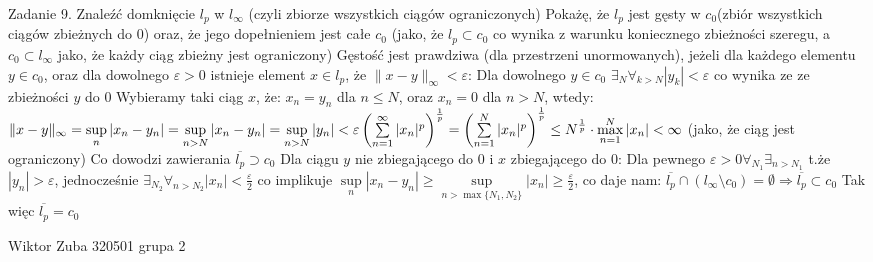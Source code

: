 \documentclass{article}
\begin{document}
Zadanie 9.
\newline
\newline
Znaleźć domknięcie $l_{p}$ w $l_{\infty}$ (czyli zbiorze wszystkich ciągów ograniczonych)\newline
Pokażę, że $l_{p}$ jest gęsty w $c_0$(zbiór wszystkich ciągów zbieżnych do 0) oraz, że jego dopełnieniem jest całe $c_0$
(jako, że $l_{p}\subset c_0$ co wynika z warunku koniecznego zbieżności szeregu,\newline
a $c_0\subset l_{\infty}$ jako, że  każdy ciąg zbieżny jest ograniczony)\newline
Gęstość jest prawdziwa (dla przestrzeni unormowanych), jeżeli dla każdego elementu $y\in c_0$, oraz dla dowolnego $\varepsilon>0$
istnieje element $x\in l_{p}$, że $\lVert x-y\rVert_{\infty}<\varepsilon$:\newline
Dla dowolnego $y\in c_0$ $\exists_{N}\forall_{k>N} |y_k|<\varepsilon$ co wynika ze ze zbieżności $y$ do $0$\newline
Wybieramy taki ciąg $x$, że: $x_n=y_n$ dla $n\le N$, oraz $x_n=0$ dla $n>N$, wtedy:\newline
$
\lVert x-y\rVert_{\infty}=\sup\limits_{n}|x_n-y_n|=\sup\limits_{n>N}|x_n-y_n|=\sup\limits_{n>N}|y_n|<\varepsilon\newline
\left(\sum\limits_{n=1}^{\infty}|x_n|^p\right)^{\frac{1}{p}}=\left(\sum\limits_{n=1}^{N}|x_n|^p\right)^{\frac{1}{p}}\le
N^{\frac{1}{p}}\cdot\max\limits_{n=1}^{N}|x_n|<\infty$ (jako, że ciąg jest ograniczony)\newline
Co dowodzi zawierania $\overline{l_p}\supset c_0$\newline
Dla ciągu $y$ nie zbiegającego do $0$ i $x$ zbiegającego do $0$:
Dla pewnego $\varepsilon>0 \forall_{N_1}\exists_{n>N_1}$ t.że $|y_n|>\varepsilon$,\newline
jednocześnie $\exists_{N_2}\forall_{n>N_2} |x_n|<\frac{\varepsilon}{2}$
co implikuje $\sup\limits_{n}|x_n-y_n|\ge\sup\limits_{n>\max\{N_1,N_2\}}|x_n|\ge\frac{\varepsilon}{2}$, co daje nam:\newline
$\overline{l_p}\cap(l_{\infty}\setminus c_0)=\emptyset\Rightarrow\overline{l_p}\subset c_0$\newline
Tak więc $\overline{l_p}=c_0$\newpage

Wiktor Zuba 320501 grupa 2
\newline
\end{document}
